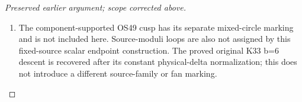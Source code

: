 \begin{proof}[Preserved earlier argument; scope corrected above]
\begin{enumerate}[label=\arabic*.]
\par\medskip\noindent\textbf{Audit scope.}\enspace

\item The component-supported OS49 cusp has its separate mixed-circle
marking and is not included here. Source-moduli loops are also
not assigned by this fixed-source scalar endpoint construction.
The proved original K33 b=6 descent is recovered after its
constant physical-delta normalization; this does not introduce
a different source-family or fan marking.

\end{enumerate}
\end{proof}